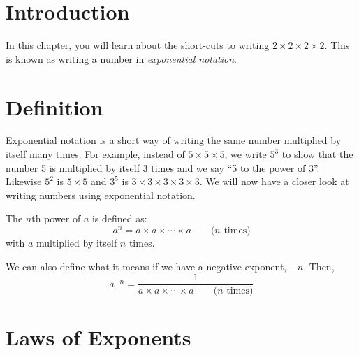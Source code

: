 \documentclass[10pt,a4paper,titlepage,twoside,openright]{report}
\begin{document}
\section{Introduction}
\label{mn:intro}

In this chapter, you will learn about the short-cuts to writing $2\times 2\times 2 \times 2$. This is known as writing a number in \textit{exponential notation}.

\section{Definition}
\label{m:n:en:10:def}

Exponential notation is a short way of writing the same number multiplied by
itself many times. For example, instead of $5 \times 5 \times 5$, we write $5^3$ to show that the number 5 is multiplied by itself 3 times and we say ``5 to the power of 3''. Likewise $5^2$ is $5\times 5$ and $3^5$ is $3\times 3\times 3\times 3\times 3$. We will now have a closer look at writing numbers using exponential notation.


The $n$th power of $a$ is defined as:
\begin{equation}
\label{eq:mn:e:nth}
a^n=a\times a\times\cdots\times a\qquad\textrm{(}n\textrm{ times)}
\end{equation}
with $a$ multiplied by itself $n$ times.

We can also define what it means if we have a negative exponent, $-n$. Then, 
\begin{equation}
\label{eq:mn:e:nth:neg}
a^{-n}=\frac{1}{a\times a\times\cdots\times a\qquad\textrm{(}n\textrm{ times)}}
\end{equation}


\section{Laws of Exponents}
\end{document}
